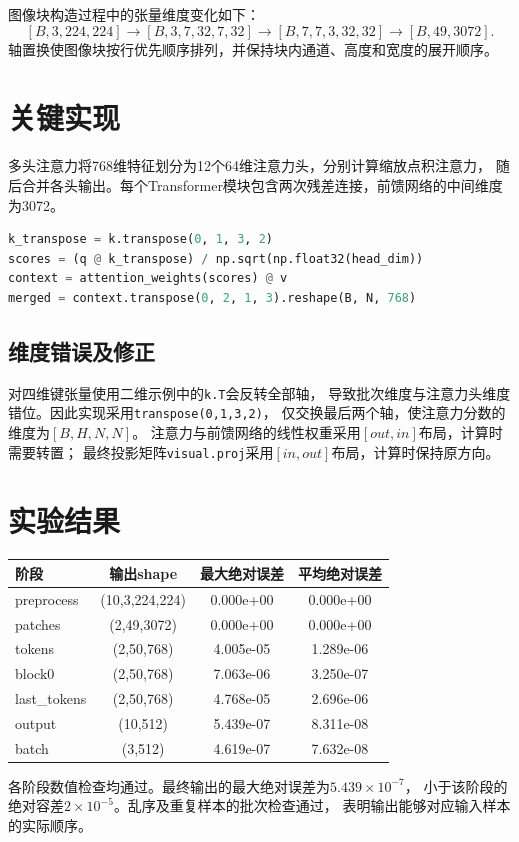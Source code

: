 \documentclass[a4paper,11pt]{ctexart}
\begin{document}
图像块构造过程中的张量维度变化如下：
\[
[B,3,224,224]\rightarrow[B,3,7,32,7,32]
\rightarrow[B,7,7,3,32,32]\rightarrow[B,49,3072].
\]
轴置换使图像块按行优先顺序排列，并保持块内通道、高度和宽度的展开顺序。

\section{关键实现}
多头注意力将768维特征划分为12个64维注意力头，分别计算缩放点积注意力，
随后合并各头输出。每个Transformer模块包含两次残差连接，前馈网络的中间维度为3072。
\begin{lstlisting}[language=Python]
k_transpose = k.transpose(0, 1, 3, 2)
scores = (q @ k_transpose) / np.sqrt(np.float32(head_dim))
context = attention_weights(scores) @ v
merged = context.transpose(0, 2, 1, 3).reshape(B, N, 768)
\end{lstlisting}

\subsection{维度错误及修正}
对四维键张量使用二维示例中的\texttt{k.T}会反转全部轴，
导致批次维度与注意力头维度错位。因此实现采用\texttt{transpose(0,1,3,2)}，
仅交换最后两个轴，使注意力分数的维度为$[B,H,N,N]$。
注意力与前馈网络的线性权重采用$[out,in]$布局，计算时需要转置；
最终投影矩阵\texttt{visual.proj}采用$[in,out]$布局，计算时保持原方向。

\newpage
\section{实验结果}
\begin{center}
\begin{tabular}{lccc}
\toprule
阶段 & 输出shape & 最大绝对误差 & 平均绝对误差\\
\midrule
preprocess & (10,3,224,224) & 0.000e+00 & 0.000e+00\\
patches & (2,49,3072) & 0.000e+00 & 0.000e+00\\
tokens & (2,50,768) & 4.005e-05 & 1.289e-06\\
block0 & (2,50,768) & 7.063e-06 & 3.250e-07\\
last\_tokens & (2,50,768) & 4.768e-05 & 2.696e-06\\
output & (10,512) & 5.439e-07 & 8.311e-08\\
batch & (3,512) & 4.619e-07 & 7.632e-08\\
\bottomrule
\end{tabular}
\end{center}
各阶段数值检查均通过。最终输出的最大绝对误差为$5.439\times10^{-7}$，
小于该阶段的绝对容差$2\times10^{-5}$。乱序及重复样本的批次检查通过，
表明输出能够对应输入样本的实际顺序。
\end{document}
